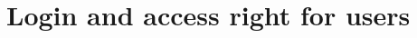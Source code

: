 \documentclass[Main]{subfiles}
\begin{document}
\section{Login and access right for users}
\end{document}
